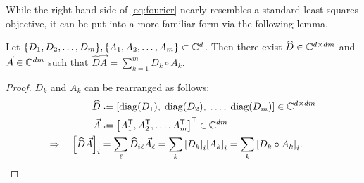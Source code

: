 \documentclass{article} %
\begin{document}
While the right-hand side of \eqref{eq:fourier} nearly resembles a standard
least-squares objective, it can be put into a more familiar form via the following
lemma.
\begin{lemma}
Let $\{D_1, D_2, \dots, D_m\}, \{A_1, A_2, \dots, A_m\} \subset \mathbb{C}^d$.  
Then there exist ${\widehat{D} \in \mathbb{C}^{d\times dm}}$ and ${\vec{A} \in \mathbb{C}^{dm}}$ such that 
${\widehat{D}\vec{A} = \sum_{k=1}^m D_k \circ A_k}$.\label{lemma:hadamard}
\end{lemma}
\begin{proof}
$D_k$ and $A_k$ can be rearranged as follows:
\begin{align*}
\widehat{D} &\defeq \left[\diag(D_1),\; \diag(D_2),\; \dots,\; \diag(D_m)\right] \in \C^{d\times dm}\\
\vec{A} &\defeq \left[A_1\trans, A_2\trans, \dots,
A_m\trans\right]\trans \in \C^{dm}\\
\Rightarrow \quad {\left[\widehat{D}\vec{A}\right]}_i &= \sum_\ell \widehat{D}_{i\ell}
\vec{A}_\ell = \sum_k {[D_k]}_i {[A_k]}_i = \sum_k
{[D_k \circ A_k]}_i.
\end{align*}
\end{proof}
\end{document}
